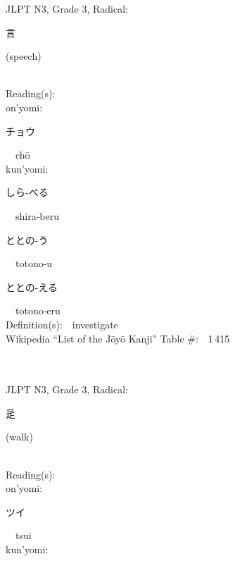 \begin{multicols}{2}
{JLPT N3, Grade 3, Radical:\ \ {\begin{CJK}{UTF8}{min} 言 \end{CJK}} (speech) } \\
Reading(s):\ \ \\
{\hspace*{1em}}on'yomi:\ \ \\
{\hspace*{2em}}{\begin{CJK}{UTF8}{min} チョウ \end{CJK}}\ \ ch\=o\ \ \\
{\hspace*{1em}}kun'yomi:\ \ \\
{\hspace*{2em}}{\begin{CJK}{UTF8}{min} しら-べる \end{CJK}}\ \ shira-beru\ \ \\
{\hspace*{2em}}{\begin{CJK}{UTF8}{min} ととの-う \end{CJK}}\ \ totono-u\ \ \\
{\hspace*{2em}}{\begin{CJK}{UTF8}{min} ととの-える \end{CJK}}\ \ totono-eru\ \ \\
Definition(s):\ \ investigate \\
Wikipedia ``List of the J\=oy\=o Kanji'' Table \#:\ \ 1\,415 \\
\ \ \\
{\fontsize{34pt}{40pt}  }\ \ \\  %
{JLPT N3, Grade 3, Radical:\ \ {\begin{CJK}{UTF8}{min} 辵 \end{CJK}} (walk) } \\
Reading(s):\ \ \\
{\hspace*{1em}}on'yomi:\ \ \\
{\hspace*{2em}}{\begin{CJK}{UTF8}{min} ツイ \end{CJK}}\ \ tsui\ \ \\
{\hspace*{1em}}kun'yomi:\ \ \\

\end{multicols}
